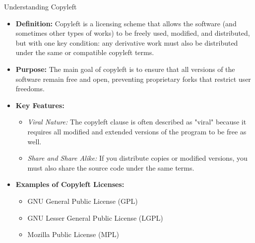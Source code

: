 \documentclass[10pt]{beamer}
\begin{document}
\begin{frame}{Understanding Copyleft}
  \begin{itemize}
      \item \textbf{Definition:} Copyleft is a licensing scheme that allows the software (and sometimes other types of works) to be freely used, modified, and distributed, but with one key condition: any derivative work must also be distributed under the same or compatible copyleft terms.
      
      \item \textbf{Purpose:} The main goal of copyleft is to ensure that all versions of the software remain free and open, preventing proprietary forks that restrict user freedoms.
      
      \item \textbf{Key Features:}
          \begin{itemize}
              \item \textit{Viral Nature:} The copyleft clause is often described as "viral" because it requires all modified and extended versions of the program to be free as well.
              \item \textit{Share and Share Alike:} If you distribute copies or modified versions, you must also share the source code under the same terms.
          \end{itemize}
      
      \item \textbf{Examples of Copyleft Licenses:}
          \begin{itemize}
              \item GNU General Public License (GPL)
              \item GNU Lesser General Public License (LGPL)
              \item Mozilla Public License (MPL)
          \end{itemize}
  \end{itemize}
\end{frame}
\end{document}
